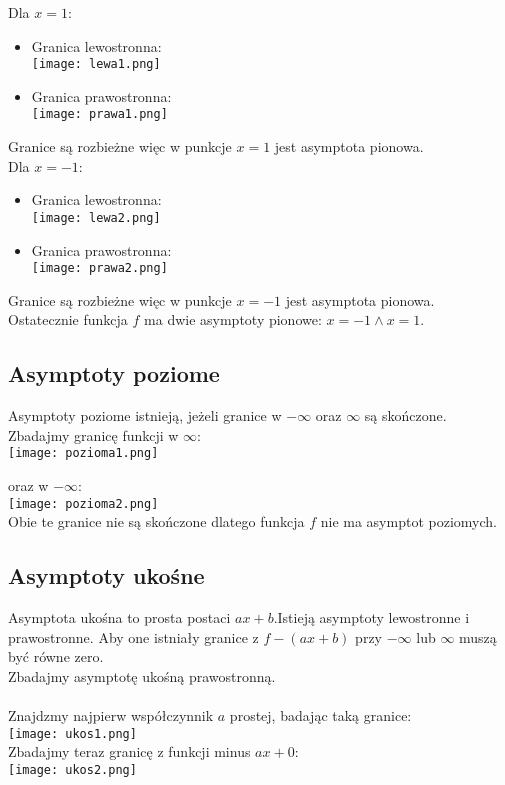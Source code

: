 \documentclass[a4paper,10pt]{article}
\begin{document}
Dla $x=1$:

\begin{itemize}
	\item Granica lewostronna:\\
	\texttt{[image: lewa1.png]}
	\item Granica prawostronna:\\
	\texttt{[image: prawa1.png]}
\end{itemize}
Granice są rozbieżne więc w punkcje $x=1$ jest asymptota pionowa.\\

Dla $x=-1$:

\begin{itemize}
	\item Granica lewostronna:\\
	\texttt{[image: lewa2.png]}
	\item Granica prawostronna:\\
	\texttt{[image: prawa2.png]}
\end{itemize}
Granice są rozbieżne więc w punkcje $x=-1$ jest asymptota pionowa.\\

Ostatecznie funkcja $f$ ma dwie asymptoty pionowe: $x=-1 \land x=1$.

\subsection{Asymptoty poziome}
Asymptoty poziome istnieją, jeżeli granice w $-\infty $ oraz $\infty $ są skończone.\\

Zbadajmy granicę funkcji w $\infty $:\\
\texttt{[image: pozioma1.png]}

oraz w $-\infty $:\\
\texttt{[image: pozioma2.png]}\\

Obie te granice nie są skończone dlatego funkcja $f$ nie ma asymptot poziomych.

\subsection{Asymptoty ukośne}
Asymptota ukośna to prosta postaci $ax+b$.Istieją asymptoty lewostronne i prawostronne. Aby one istniały granice z $f-(ax+b)$ przy $-\infty$ lub $\infty$ muszą być równe zero.\\

Zbadajmy asymptotę ukośną prawostronną.\\ \\
Znajdzmy najpierw współczynnik $a$ prostej, badając taką granice:\\
\texttt{[image: ukos1.png]}\\
Zbadajmy teraz granicę z funkcji minus $ax + 0$:\\
\texttt{[image: ukos2.png]}\\
\end{document}
